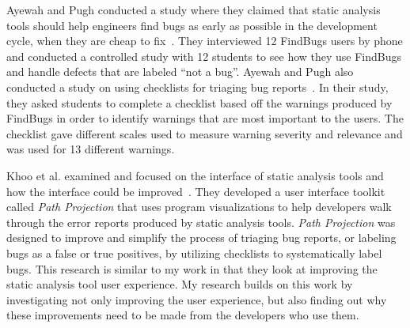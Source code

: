 \documentclass{llncs}
\begin{document}
Ayewah and Pugh conducted a study where they claimed that static analysis tools
should help engineers find bugs as early as possible in the development cycle,
when they are cheap to fix~\cite{Ayewah:2008:FBSurvey}. They interviewed 12
FindBugs users by phone and conducted a controlled study with 12 students to see
how they use FindBugs and handle defects that are labeled ``not a bug''. 
Ayewah and Pugh also conducted a study on using checklists for triaging bug
reports~\cite{Ayewah:2009:Checklists}. In their study, they asked students to
complete a checklist based off the warnings produced by FindBugs in order to
identify warnings that are most important to the users. The checklist gave
different scales used to measure warning severity and relevance and was used
for 13 different warnings.

Khoo et al. examined and focused on the interface of static analysis tools and
how the interface could be improved~\cite{Khoo:2008:PathProjection}. They
developed a user interface toolkit called \emph{Path Projection} that uses
program visualizations to help developers walk through the error reports
produced by static analysis tools.
\emph{Path Projection} was designed to improve and simplify the process of
triaging bug reports, or labeling bugs as a false or true positives, by
utilizing checklists to systematically label bugs. This research is similar to my
work in that they look at improving the static analysis tool user experience.
My research builds on this work by investigating not only improving the user
experience, but also finding out why these improvements need to be made from the
developers who use them.

\end{document}
